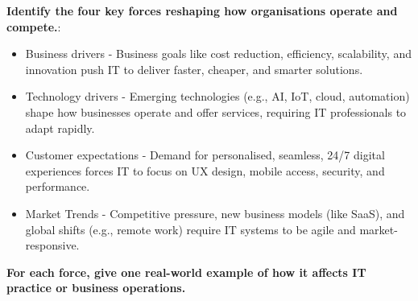 \noindent\textbf{Identify the four key forces reshaping how organisations operate and compete.}: 

\begin{itemize}
    \item Business drivers - Business goals like cost reduction, efficiency, scalability, and innovation push IT to deliver faster, cheaper, and smarter solutions.
    \item Technology drivers - Emerging technologies (e.g., AI, IoT, cloud, automation) shape how businesses operate and offer services, requiring IT professionals to adapt rapidly.
    \item Customer expectations - Demand for personalised, seamless, 24/7 digital experiences forces IT to focus on UX design, mobile access, security, and performance.
    \item Market Trends - Competitive pressure, new business models (like SaaS), and global shifts (e.g., remote work) require IT systems to be agile and market-responsive.
\end{itemize}

\noindent\textbf{For each force, give one real-world example of how it affects IT practice or business operations.}